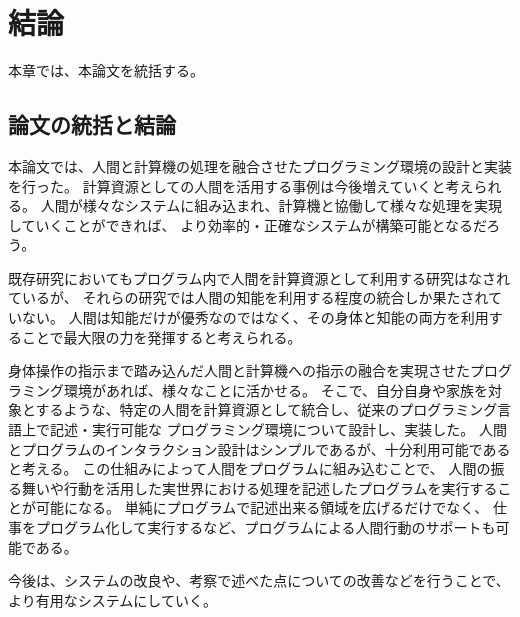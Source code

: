 \chapter{結論}\label{chap:conclusion}

本章では、本論文を統括する。

\newpage

\section{論文の統括と結論}\label{ux8ad6ux6587ux306eux7d71ux62ecux3068ux7d50ux8ad6}

本論文では、人間と計算機の処理を融合させたプログラミング環境の設計と実装を行った。
計算資源としての人間を活用する事例は今後増えていくと考えられる。
人間が様々なシステムに組み込まれ、計算機と協働して様々な処理を実現していくことができれば、
より効率的・正確なシステムが構築可能となるだろう。

既存研究においてもプログラム内で人間を計算資源として利用する研究はなされているが、
それらの研究では人間の知能を利用する程度の統合しか果たされていない。
人間は知能だけが優秀なのではなく、その身体と知能の両方を利用することで最大限の力を発揮すると考えられる。

身体操作の指示まで踏み込んだ人間と計算機への指示の融合を実現させたプログラミング環境があれば、様々なことに活かせる。
そこで、自分自身や家族を対象とするような、特定の人間を計算資源として統合し、従来のプログラミング言語上で記述・実行可能な
プログラミング環境について設計し、実装した。
人間とプログラムのインタラクション設計はシンプルであるが、十分利用可能であると考える。
この仕組みによって人間をプログラムに組み込むことで、
人間の振る舞いや行動を活用した実世界における処理を記述したプログラムを実行することが可能になる。
単純にプログラムで記述出来る領域を広げるだけでなく、
仕事をプログラム化して実行するなど、プログラムによる人間行動のサポートも可能である。

今後は、システムの改良や、考察で述べた点についての改善などを行うことで、
より有用なシステムにしていく。
